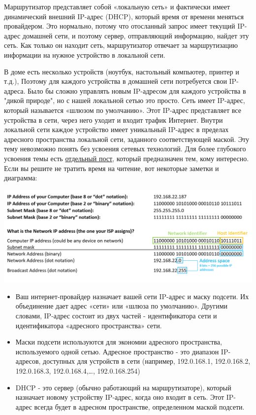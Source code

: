 \documentclass{article}
\begin{document}
Маршрутизатор представляет собой «локальную сеть» и фактически имеет
динамический внешний IP-адрес (DHCP), который время от времени меняться
провайдером. Это нормально, потому что отосланный запрос имеет текущий
IP-адрес домашней сети, и поэтому сервер, отправляющий информацию,
найдет эту сеть. Как только он находит сеть, маршрутизатор отвечает за
маршрутизацию информации на нужное устройство в локальной сети.

В доме есть несколько устройств (ноутбук, настольный компьютер, принтер
и т.д.), Поэтому для каждого устройства в домашней сети потребуется свои
IP-адреса. Было бы сложно управлять новым IP-адресом для каждого
устройства в "дикой природе", но с нашей локальной сетью это просто.
Сеть имеет IP-адрес, который называется «шлюзом по умолчанию». Этот
IP-адрес представляет все устройства в сети, через него уходит и входит
трафик Интернет. Внутри локальной сети каждое устройство имеет
уникальный IP-адрес в пределах адресного пространства локальной сети,
заданного соответствующей маской. Эту тему невозможно понять без
усвоения сетевых технологий. Для более глубокого усвоения темы есть
\href{blog/2019/ip-addresses-netmasks}{отдельный пост}, который
предназначен тем, кому интересно. Если вы решите не тратить время на
читение, вот некоторые заметки и диаграмма:

\includegraphics{blog/2019/bash-essentials/ipaddresses.PNG}

\begin{itemize}
\tightlist
\item
  Ваш интернет-провайдер назначает вашей сети IP-адрес и маску подсети.
  Их объединение дает адрес «сети» или «шлюза по умолчанию». Другими
  словами, IP-адрес состоит из двух частей - идентификатора сети и
  идентификатора «адресного пространства» сети.
\item
  Маски подсети используются для экономии адресного пространства,
  используемого одной сетью. Адресное пространство - это диапазон
  IP-адресов, доступных для устройств в сети (например, 192.0.168.1,
  192.0.168.2, 192.0.168.3, 192.0.168.4,\ldots, 192.0.168.254)
\item
  DHCP - это сервер (обычно работающий на маршрутизаторе), который
  назначает новому устройству IP-адрес, когда оно входит в сеть. Этот
  IP-адрес всегда будет в адресном пространстве, определенном маской
  подсети.
\end{itemize}
\end{document}
